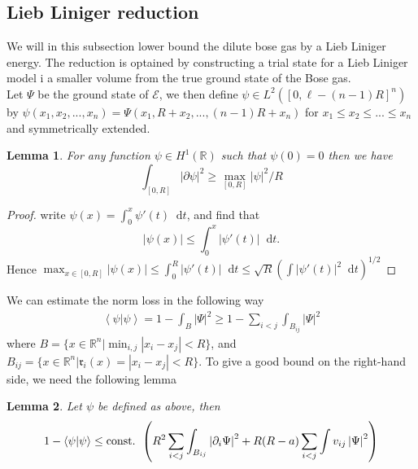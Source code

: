 \documentclass[a4paper,11pt]{article}
\newcommand{\abs}[1]{\left\lvert #1 \right\rvert}
\renewcommand{\braket}[1]{\left\langle#1\right\rangle}
\newcommand*\diff{\mathop{}\!\mathrm{d}}
\newcommand{\R}{\mathbb{R}}
\newtheorem{lemma}{Lemma}
\numberwithin{equation}{section}
\begin{document}
	\subsection{Lieb Liniger reduction}
	We will in this subsection lower bound the dilute bose gas by a Lieb Liniger energy. The reduction is optained by constructing a trial state for a Lieb Liniger model i a smaller volume from the true ground state of the Bose gas.\\
		Let $ \Psi $ be the ground state of $ \mathcal{E} $, we then define $ \psi\in L^2([0,\ell-(n-1)R]^n) $ by $ \psi(x_1,x_2,...,x_n)=\Psi(x_1,R+x_2,...,(n-1)R+x_n) $ for $ x_1\leq x_2\leq...\leq x_n $ and symmetrically extended. 
	\begin{lemma}
		For any function $ \psi\in H^1(\R) $ such that $ \psi(0)=0 $ then we have\begin{equation}\label{EqSobolevIneq}
		\int_{[0,R]}\abs{\partial\psi}^2\geq \max_{[0,R]}\abs{\psi}^2/R
		\end{equation}
	\end{lemma}
	\begin{proof}
		write $ \psi(x)=\int_{0}^{x}\psi'(t)\diff t $, and find that \begin{equation}
		\abs{\psi(x)}\leq \int_{0}^{x}\abs{\psi'(t)}\diff t.
		\end{equation}
		Hence $ \max_{x\in[0,R]}\abs{\psi(x)}\leq \int_{0}^{R}\abs{\psi'(t)}\diff t\leq \sqrt{R}\left(\int\abs{\psi'(t)}^2\diff t\right)^{1/2} $
	\end{proof}
	We can estimate the norm loss in the following way
	\begin{equation}\label{EqNormBoundBij}
	\begin{aligned}
	\braket{\psi|\psi}=1-\int_{B}\abs{\Psi}^2\geq 1-\sum_{i<j}\int_{B_{ij}}\abs{\Psi}^2
	\end{aligned}
	\end{equation}
	where $ B=\{x\in\R^n\vert \min_{i,j}\abs{x_i-x_j}<R \} $, and $ B_{ij}=\{x\in\R^n \vert \mathfrak{r}_i(x)=\abs{x_i-x_j}<R \} $. To give a good bound on the right-hand side, we need the following lemma
	\begin{lemma}\label{LemmaNormLoss}
		Let $ \psi $ be defined as above, then \begin{equation}
		1-\braket{\psi|\psi}\leq\textnormal{const. } \left(R^2\sum_{i<j}\int_{B_{ij}}\abs{\partial_i \Psi}^2+R(R-a)\sum_{i<j}\int v_{ij} \abs{\Psi}^2\right)
		\end{equation}
	\end{lemma}
\end{document}
